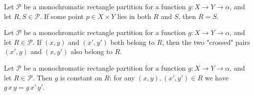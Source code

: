 \begin{theorem}
\label{CommunicationComplexity.Rectangle.monoPartition_part_unique}
\leanok
{}
Let $\mathcal{P}$ be a monochromatic rectangle partition for a function $g : X \to Y \to
\alpha$, and let $R, S \in \mathcal{P}$. If some point $p \in X \times Y$ lies in both
$R$ and $S$, then $R = S$.
\end{theorem}

\begin{theorem}
\label{CommunicationComplexity.Rectangle.monoPartition_cross_mem}
\leanok
{}
Let $\mathcal{P}$ be a monochromatic rectangle partition for a function $g : X \to Y \to
\alpha$, and let $R \in \mathcal{P}$. If $(x,y)$ and $(x',y')$ both belong to $R$, then
the two "crossed" pairs $(x',y)$ and $(x,y')$ also belong to $R$.
\end{theorem}

\begin{theorem}
\label{CommunicationComplexity.Rectangle.monoPartition_values_eq}
\leanok
{}
Let $\mathcal{P}$ be a monochromatic rectangle partition for a function $g : X \to Y \to
\alpha$, and let $R \in \mathcal{P}$. Then $g$ is constant on $R$: for any $(x,y),
(x',y') \in R$ we have $g\,x\,y = g\,x'\,y'$.
\end{theorem}

